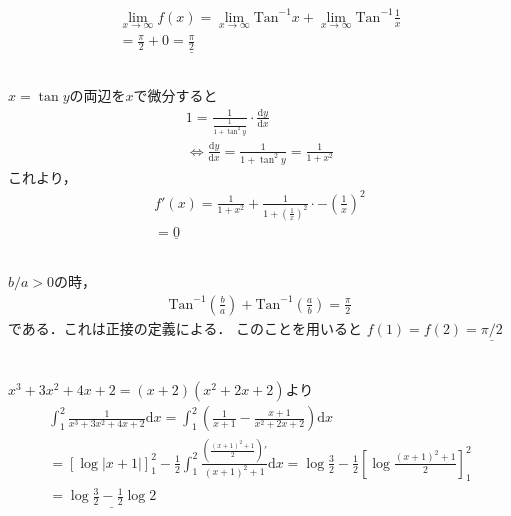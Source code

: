 \documentclass[dvipdfmx]{jsarticle}
\begin{document}
  \section{}
    \subsection{}
      \begin{align*}
        \lim_{x \to \infty} f(x) = \lim_{x \to \infty} \mathrm{Tan}^{-1} x + \lim_{x \to \infty} \mathrm{Tan}^{-1} \frac{1}{x}\\
        = \frac{\pi}{2} + 0 = \underline{\frac{\pi}{2}}
      \end{align*}
    \subsection{}
      $x = \tan y$の両辺を$x$で微分すると
      \begin{align*}
        1 = \frac{1}{\frac{1}{1 + \tan^2 y}} \cdot \frac{\mathrm{d}y}{\mathrm{d}x}\\
        \Leftrightarrow \frac{\mathrm{d}y}{\mathrm{d}x} = \frac{1}{1 +\tan^2 y} = \frac{1}{1 + x^2}
      \end{align*}
      これより，
      \begin{align*}
        f'(x) = \frac{1}{1 + x^2} + \frac{1}{1+\left(\frac{1}{x}\right)^2}\cdot -\left(\frac{1}{x}\right)^2\\
        = \underline{0}
      \end{align*}
    \subsection{}
      $b/a > 0$の時，
      \begin{align*}
        \mathrm{Tan}^{-1} \left(\frac{b}{a}\right) + \mathrm{Tan}^{-1} \left(\frac{a}{b}\right) = \frac{\pi}{2}
      \end{align*}
      である．これは正接の定義による．
      このことを用いると
      $f(1) = f(2) = \underline{\pi / 2}$
  \section{}
      $x^3 + 3x^2 + 4x + 2 = (x + 2)(x^2 + 2x + 2)$より
      \begin{align*}
        \int_{1}^{2} \frac{1}{x^3 + 3x^2 + 4x + 2} \mathrm{d}x 
        = \int_{1}^{2} \left(\frac{1}{x + 1} - \frac{x + 1}{x^2 + 2x + 2}\right) \mathrm{d}x\\
        = \left[\log |x + 1|\right]_{1}^{2} -\frac{1}{2}\int_{1}^{2} \frac{\left(\frac{(x+1)^2 + 1}{2}\right)'}{(x+1)^2 + 1}\mathrm{d}x
        = \log \frac{3}{2} - \frac{1}{2} \left[\log \frac{(x+1)^2 + 1}{2}\right]_{1}^{2}\\
        = \underline{\log \frac{3}{2} - \frac{1}{2}\log 2}
      \end{align*}
\end{document}
